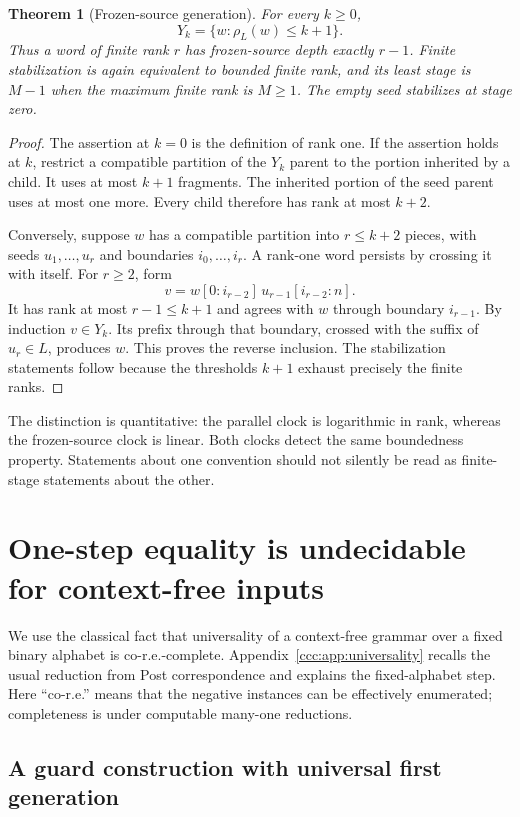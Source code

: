 \documentclass[11pt,letterpaper]{article}
\newtheorem{theorem}{Theorem}[section]
\theoremstyle{definition}
\theoremstyle{remark}
\newcommand{\rank}{\rho}
\begin{document}
\begin{theorem}[Frozen-source generation]\label{ccc:thm:frozen}
For every $k\geq0$,
\[
 Y_k=\{w:\rank_L(w)\leq k+1\}.
\]
Thus a word of finite rank $r$ has frozen-source depth exactly $r-1$.
Finite stabilization is again equivalent to bounded finite rank, and its
least stage is $M-1$ when the maximum finite rank is $M\geq1$.
The empty seed stabilizes at stage zero.
\end{theorem}
\begin{proof}
The assertion at $k=0$ is the definition of rank one. If the assertion holds
at $k$, restrict a compatible partition of the $Y_k$ parent to the portion
inherited by a child. It uses at most $k+1$ fragments. The inherited portion
of the seed parent uses at most one more. Every child therefore has rank at
most $k+2$.

Conversely, suppose $w$ has a compatible partition into $r\leq k+2$ pieces,
with seeds $u_1,\ldots,u_r$ and boundaries $i_0,\ldots,i_r$. A rank-one word
persists by crossing it with itself. For $r\geq2$, form
\[
 v=w[0:i_{r-2}]\,u_{r-1}[i_{r-2}:n].
\]
It has rank at most $r-1\leq k+1$ and agrees with $w$ through boundary
$i_{r-1}$. By induction $v\in Y_k$. Its prefix through that boundary,
crossed with the suffix of $u_r\in L$, produces $w$. This proves the reverse
inclusion. The stabilization statements follow because the thresholds $k+1$
exhaust precisely the finite ranks.
\end{proof}

The distinction is quantitative: the parallel clock is logarithmic in rank,
whereas the frozen-source clock is linear. Both clocks detect the same
boundedness property. Statements about one convention should not silently be
read as finite-stage statements about the other.

\section{One-step equality is undecidable for context-free inputs}
\label{ccc:sec:undecidable}

We use the classical fact that universality of a context-free grammar over a
fixed binary alphabet is co-r.e.-complete. Appendix~\ref{ccc:app:universality}
recalls the usual reduction from Post correspondence and explains the
fixed-alphabet step. Here ``co-r.e.'' means that the negative instances can be
effectively enumerated; completeness is under computable many-one reductions.

\subsection{A guard construction with universal first generation}
\end{document}
